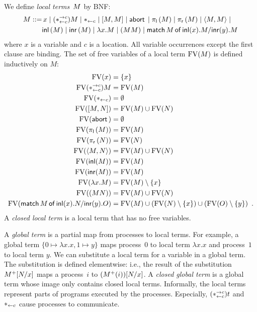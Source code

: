 We define \textit{local terms}~$M$ by BNF:
\begin{align*}
M ::=&\,
 x\mid (\ast^{\rightarrow {c}}_{\leftarrow{c}}) M \mid \ast_{\leftarrow{c}}
 \mid
 [{M,M}] \mid \mathsf{abort\,} \mid
  \pi_{\mathsf l}\left({M}\right) \mid \pi_{\mathsf r}\left({M}\right) \mid
 \langle{M,M}\rangle\mid \\&
  \mathsf{inl}\left({M}\right) \mid  \mathsf{inr}\left({M}\right) \mid
 \lambda x.M\mid (M M)
\mid \mathsf{match}\,{M}\,\mathsf{of}\, \mathsf{inl}({x}). {M}/ \mathsf{inr}({y}). {M}
\end{align*}
where $x$ is a variable and $c$ is a location.
All variable occurrences except the first clause are binding.
The set of free variables of a local term $\mathrm{FV}(M)$ is defined inductively
on $M$:
\begin{align*}
 \mathrm{FV}(x)&= \{x\}\\
 \mathrm{FV}(\ast^{\rightarrow {c}}_{\leftarrow{c}}) M&= \mathrm{FV}(M)\\
 \mathrm{FV}(\ast_{\leftarrow{c}}) &= \emptyset\\
 \mathrm{FV}([{M,N}])&= \mathrm{FV}(M)\cup \mathrm{FV}(N)\\
 \mathrm{FV}(\mathsf{abort\,})&= \emptyset\\
 \mathrm{FV}(\pi_{\mathsf l}\left({M}\right))&= \mathrm{FV}(M)\\
 \mathrm{FV}(\pi_{\mathsf r}\left({N}\right))&= \mathrm{FV}(N)\\
 \mathrm{FV}(\langle{M,N}\rangle)&= \mathrm{FV}(M)\cup \mathrm{FV}(N)\\
 \mathrm{FV}(\mathsf{inl}({M}))&= \mathrm{FV}(M)\\
 \mathrm{FV}(\mathsf{inr}({M}))&= \mathrm{FV}(M)\\
 \mathrm{FV}(\lambda x.M)&= \mathrm{FV}(M) \setminus \{x\}\\
 \mathrm{FV}((M N))&= \mathrm{FV}(M)\cup \mathrm{FV}(N)\\
 \mathrm{FV}(\mathsf{match}\,{M}\,\mathsf{of}\, \mathsf{inl}({x}). {N}/ \mathsf{inr}({y}). {O})&= \mathrm{FV}(M)\cup (\mathrm{FV}(N)\setminus \{x\}) \cup
 (\mathrm{FV}(O)\setminus\{y\})\enspace.
\end{align*}
A \textit{closed local term} is a local term
that has no free variables.

A \textit{global term} is a partial map from
processes to local
terms.  For example, a global term $\{0\mapsto \lambda x.x, 1\mapsto
y\}$ maps process~$0$ to local term $\lambda x.x$ and process~$1$ to
local term $y$.
We can substitute a local term for a variable in a global term.
The substitution is defined elementwise: i.e.,
the result of the substitution ${M}^+[N/x]$ maps a process~$i$ to $({M}^+(i))[N/x]$.
A \textit{closed global term} is a global term
whose image only contains closed local terms.
Informally, the local terms represent parts of
programs executed by the processes.
Especially, $(\ast^{\rightarrow {c}}_{\leftarrow{c}})t$ and $\ast_{\leftarrow{c}}$ cause processes to communicate.


